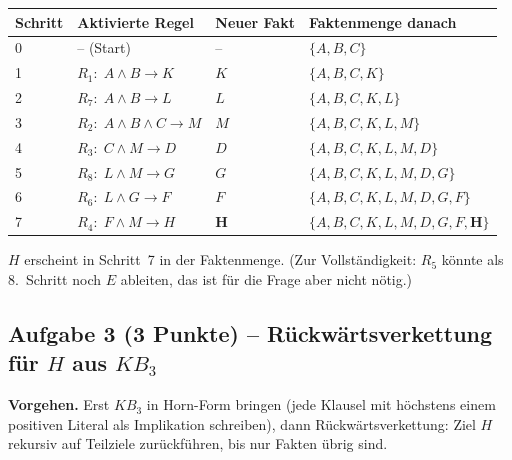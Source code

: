 \documentclass[a4paper,12pt]{article}
\begin{document}
\begin{center}
\small
\renewcommand{\arraystretch}{1.3}
\begin{tabular}{p{}p{}p{}p{}}
\toprule
Schritt & Aktivierte Regel & Neuer Fakt & Faktenmenge danach \\
\midrule
0 & -- (Start)                  & --   & $\{A, B, C\}$ \\
\midrule
1 & $R_1:\; A \wedge B \to K$   & $K$  & $\{A, B, C, K\}$ \\
\midrule
2 & $R_7:\; A \wedge B \to L$   & $L$  & $\{A, B, C, K, L\}$ \\
\midrule
3 & $R_2:\; A \wedge B \wedge C \to M$ & $M$ & $\{A, B, C, K, L, M\}$ \\
\midrule
4 & $R_3:\; C \wedge M \to D$   & $D$  & $\{A, B, C, K, L, M, D\}$ \\
\midrule
5 & $R_8:\; L \wedge M \to G$   & $G$  & $\{A, B, C, K, L, M, D, G\}$ \\
\midrule
6 & $R_6:\; L \wedge G \to F$   & $F$  & $\{A, B, C, K, L, M, D, G, F\}$ \\
\midrule
7 & $R_4:\; F \wedge M \to H$   & $\mathbf{H}$ & $\{A, B, C, K, L, M, D, G, F, \mathbf{H}\}$ \\
\bottomrule
\end{tabular}
\end{center}

$H$ erscheint in Schritt~7 in der Faktenmenge. (Zur Vollst\"andigkeit:
$R_5$ k\"onnte als 8.\ Schritt noch $E$ ableiten, das ist f\"ur die
Frage aber nicht n\"otig.)

\medskip
\noindent{}

\newpage

\subsection*{Aufgabe 3 \textnormal{(3 Punkte)} -- R\"uckw\"artsverkettung f\"ur $H$ aus $KB_3$}

\textbf{Vorgehen.} Erst $KB_3$ in Horn-Form bringen (jede Klausel mit
h\"ochstens einem positiven Literal als Implikation schreiben), dann
R\"uckw\"artsverkettung: Ziel $H$ rekursiv auf Teilziele zur\"uckf\"uhren,
bis nur Fakten \"ubrig sind.
\end{document}
